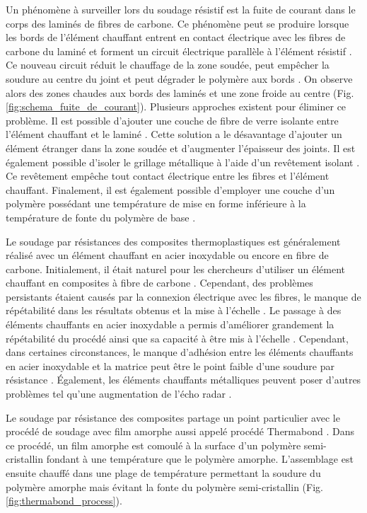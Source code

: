 Un phénomène à surveiller lors du soudage résistif est la fuite de courant dans le corps des laminés de fibres de carbone. 
Ce phénomène peut se produire lorsque les bords de l'élément chauffant entrent en contact électrique avec les fibres de carbone du laminé et forment un circuit électrique parallèle à l'élément résistif \cite{Hou1999a,Ageorges2000}. 
Ce nouveau circuit réduit le chauffage de la zone soudée, peut empêcher la soudure au centre du joint et peut dégrader le polymère aux bords \cite{Dube2008}. 
On observe alors des zones chaudes aux bords des laminés et une zone froide au centre (Fig. \ref{fig:schema_fuite_de_courant}). 
Plusieurs approches existent pour éliminer ce problème. 
Il est possible d'ajouter une couche de fibre de verre isolante entre l'élément chauffant et le laminé \cite{Hou1999a}. 
Cette solution a le désavantage d'ajouter un élément étranger dans la zone soudée et d'augmenter l'épaisseur des joints. 
Il est également possible d'isoler le grillage métallique à l'aide d'un revêtement isolant \cite{Dube2008,Dube2009a}. 
Ce revêtement empêche tout contact électrique entre les fibres et l'élément chauffant. 
Finalement, il est également possible d'employer une couche d'un polymère possédant une température de mise en forme inférieure à la température de fonte du polymère de base \cite{Stavrov2005a}. 

Le soudage par résistances des composites thermoplastiques est généralement réalisé avec un élément chauffant en acier inoxydable ou encore en fibre de carbone. 
Initialement, il était naturel pour les chercheurs d'utiliser un élément chauffant en composites à fibre de carbone \cite{Ageorges2000a,houghton1984bonding,Eveno1988}. 
Cependant, des problèmes persistants étaient causés par la connexion électrique avec les fibres, le manque de répétabilité dans les résultats obtenus et la mise à l'échelle \cite{McKnight1997}. 
Le passage à des éléments chauffants en acier inoxydable a permis d'améliorer grandement la répétabilité du procédé ainsi que sa capacité à être mis à l'échelle \cite{Hou1999a}.  
Cependant, dans certaines circonstances, le manque d'adhésion entre les éléments chauffants en acier inoxydable et la matrice peut être le point faible d'une soudure par résistance \cite{Dube2007,Dube2012a,Dube2009a,Shi2014,Shi2015a}. 
Également, les éléments chauffants métalliques peuvent poser d'autres problèmes tel qu'une augmentation de l'écho radar \cite{Ageorges2001a}. 

Le soudage par résistance des composites partage un point particulier avec le procédé de soudage avec film amorphe aussi appelé procédé Thermabond \cite{Smiley1991a}. 
Dans ce procédé, un film amorphe est comoulé à la surface d'un polymère semi-cristallin fondant à une température que le polymère amorphe. 
L'assemblage est ensuite chauffé dans une plage de température permettant la soudure du polymère amorphe mais évitant la fonte du polymère semi-cristallin (Fig. \ref{fig:thermabond_process}). 

